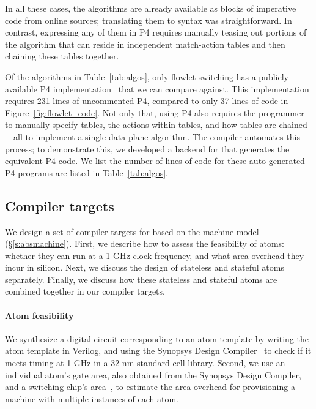 In all these cases, the algorithms are already available as blocks of
imperative code from online sources; translating them to \pktlanguage syntax
was straightforward. In contrast, expressing any of them in P4 requires
manually teasing out portions of the algorithm that can reside in independent
match-action tables and then chaining these tables together.

Of the algorithms in Table~\ref{tab:algos}, only flowlet switching has a
publicly available P4 implementation~\cite{p4_flowlet} that we can compare
against. This implementation requires 231 lines of uncommented P4, compared to
only 37 lines of \pktlanguage code in Figure~\ref{fig:flowlet_code}. Not only
that, using P4 also requires the programmer to manually specify tables, the
actions within tables, and how tables are chained---all to implement a single
data-plane algorithm. The \pktlanguage compiler automates this process; to
demonstrate this, we developed a backend for \pktlanguage that generates the
equivalent P4 code. We list the number of lines of code for these
auto-generated P4 programs are listed in Table~\ref{tab:algos}.
\subsection{Compiler targets}
\label{ss:targets}

We design a set of compiler targets for \pktlanguage based on the
\absmachine machine model (\S\ref{s:absmachine}). First, we describe how to
assess the feasibility of atoms: whether they can run at a 1 GHz clock
frequency, and what area overhead they incur in silicon. Next, we discuss the
design of stateless and stateful atoms separately. Finally, we discuss how
these stateless and stateful atoms are combined together in our compiler
targets.

\paragraph{Atom feasibility}
We synthesize a digital circuit corresponding to an atom template by
writing the atom template in Verilog, and using the Synopsys Design
Compiler~\cite{synopsys_dc} to check if it meets timing at 1 GHz in a 32-nm
standard-cell library.  Second, we use an individual atom's gate area, also
obtained from the Synopsys Design Compiler, and a switching chip's
area~\cite{gibb_parsing}, to estimate the area overhead for provisioning a
\absmachine machine with multiple instances of each atom.

